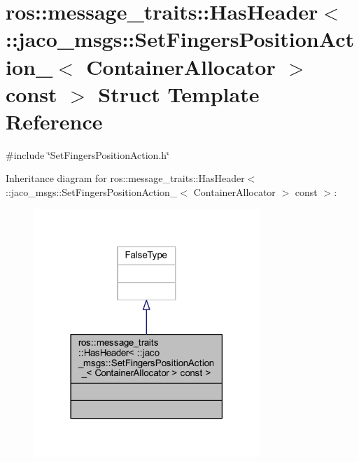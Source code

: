 \hypertarget{structros_1_1message__traits_1_1HasHeader_3_01_1_1jaco__msgs_1_1SetFingersPositionAction___3_01C8064b31d421d852fd5578439f29449da}{}\section{ros\+:\+:message\+\_\+traits\+:\+:Has\+Header$<$ \+:\+:jaco\+\_\+msgs\+:\+:Set\+Fingers\+Position\+Action\+\_\+$<$ Container\+Allocator $>$ const $>$ Struct Template Reference}
\label{structros_1_1message__traits_1_1HasHeader_3_01_1_1jaco__msgs_1_1SetFingersPositionAction___3_01C8064b31d421d852fd5578439f29449da}


{\ttfamily \#include \char`\"{}Set\+Fingers\+Position\+Action.\+h\char`\"{}}



Inheritance diagram for ros\+:\+:message\+\_\+traits\+:\+:Has\+Header$<$ \+:\+:jaco\+\_\+msgs\+:\+:Set\+Fingers\+Position\+Action\+\_\+$<$ Container\+Allocator $>$ const $>$\+:
\nopagebreak
\begin{figure}[H]
\begin{center}
\leavevmode
\includegraphics[width=242pt]{d1/dd4/structros_1_1message__traits_1_1HasHeader_3_01_1_1jaco__msgs_1_1SetFingersPositionAction___3_01C7d2bfba5271c110dccccdc7091b03ec4}
\end{center}
\end{figure}


